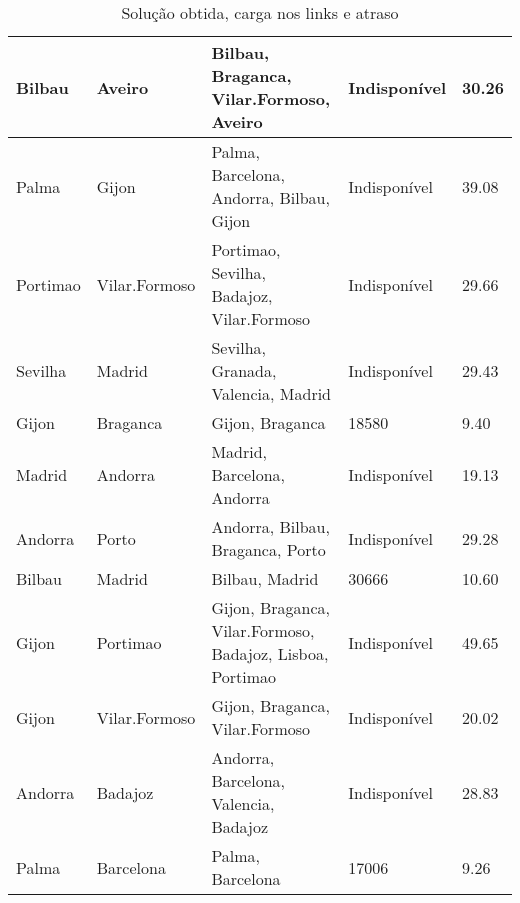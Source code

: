\begin{table}[!htb]
{\begin{tabular}{|l|l|l|l|l|}
Bilbau & Aveiro & Bilbau, Braganca, Vilar.Formoso, Aveiro & Indisponível & 30.26 \\ \hline
Palma & Gijon & Palma, Barcelona, Andorra, Bilbau, Gijon & Indisponível & 39.08 \\ \hline
Portimao & Vilar.Formoso & Portimao, Sevilha, Badajoz, Vilar.Formoso & Indisponível & 29.66 \\ \hline
Sevilha & Madrid & Sevilha, Granada, Valencia, Madrid & Indisponível & 29.43 \\ \hline
Gijon & Braganca & Gijon, Braganca & 18580 & 9.40 \\ \hline
Madrid & Andorra & Madrid, Barcelona, Andorra & Indisponível & 19.13 \\ \hline
Andorra & Porto & Andorra, Bilbau, Braganca, Porto & Indisponível & 29.28 \\ \hline
Bilbau & Madrid & Bilbau, Madrid & 30666 & 10.60 \\ \hline
Gijon & Portimao & Gijon, Braganca, Vilar.Formoso, Badajoz, Lisboa, Portimao & Indisponível & 49.65 \\ \hline
Gijon & Vilar.Formoso & Gijon, Braganca, Vilar.Formoso & Indisponível & 20.02 \\ \hline
Andorra & Badajoz & Andorra, Barcelona, Valencia, Badajoz & Indisponível & 28.83 \\ \hline
Palma & Barcelona & Palma, Barcelona & 17006 & 9.26 \\ \hline
\end{tabular}}
\caption[]{Solução obtida, carga nos links e atraso}
\end{table}

